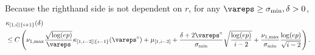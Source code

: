 \documentclass[aos]{imsart}
\begin{document}
\begin{appendix}
Because the righthand side is not dependent on $r$, for any $\vareps \geq \sigma_{\min}, \delta > 0$, 
\begin{equation*} %
\begin{aligned}
    & \kappa_{[1,i]|\{i+1\}}(\delta) \\
    & \leq C \left( 
        \nu_{1,\max} \frac{\sqrt{\log(ep)}}{\vareps} \kappa_{[1,i-2]|\{i-1\}}(\vareps^\circ)
        + \mu_{[1,i-2]} 
    + \frac{\delta + 2\vareps^\circ}{\sigma_{\min}} \sqrt{\frac{\log(ep)}{i-2}}
    + \frac{\nu_{1,\max}}{\sigma_{\min}} \frac{\log(ep)}{\sqrt{i-2}}
    \right).
\end{aligned}
\end{equation*}


\end{appendix}
\end{document}
